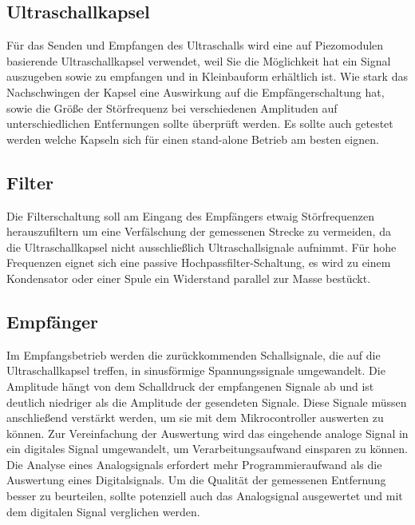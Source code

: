 \subsection{Ultraschallkapsel}
Für das Senden und Empfangen des Ultraschalls wird eine auf Piezomodulen basierende Ultraschallkapsel verwendet, weil Sie die Möglichkeit hat ein Signal auszugeben sowie zu empfangen und in Kleinbauform erhältlich ist. Wie stark das Nachschwingen der Kapsel eine Auswirkung auf die Empfängerschaltung hat, sowie die Größe der Störfrequenz bei verschiedenen Amplituden auf unterschiedlichen Entfernungen sollte überprüft werden. Es sollte auch getestet werden welche Kapseln sich für einen stand-alone Betrieb am besten eignen.

\subsection{Filter}
Die Filterschaltung soll am Eingang des Empfängers etwaig Störfrequenzen herauszufiltern um eine Verfälschung der gemessenen Strecke zu vermeiden, da die Ultraschallkapsel nicht ausschließlich Ultraschallsignale aufnimmt. Für hohe Frequenzen eignet sich eine passive Hochpassfilter-Schaltung, es wird zu einem Kondensator oder einer Spule ein Widerstand parallel zur Masse bestückt. 

\subsection{Empfänger}
Im Empfangsbetrieb werden die zurückkommenden Schallsignale, die auf die Ultraschallkapsel treffen, in sinusförmige Spannungssignale umgewandelt. Die Amplitude hängt von dem Schalldruck der empfangenen Signale ab und ist deutlich niedriger als die Amplitude der gesendeten Signale. Diese Signale müssen anschließend verstärkt werden, um sie mit dem Mikrocontroller auswerten zu können. Zur Vereinfachung der Auswertung wird das eingehende analoge Signal in ein digitales Signal umgewandelt, um Verarbeitungsaufwand einsparen zu können. Die Analyse eines Analogsignals erfordert mehr Programmieraufwand als die Auswertung eines Digitalsignals. Um die Qualität der gemessenen Entfernung besser zu beurteilen, sollte potenziell auch das Analogsignal ausgewertet und mit dem digitalen Signal verglichen werden. 













